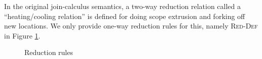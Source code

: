 In the original join-calculus semantics, a two-way reduction relation called a
``heating/cooling relation'' is defined for doing scope extrusion and forking
off new locations. We only provide one-way reduction rules for this, namely \textsc{Red-Def} in Figure \ref{fig:rule:red}.
\begin{figure}[!h]
\caption{Reduction rules}\label{fig:rule:red}
\end{figure}

